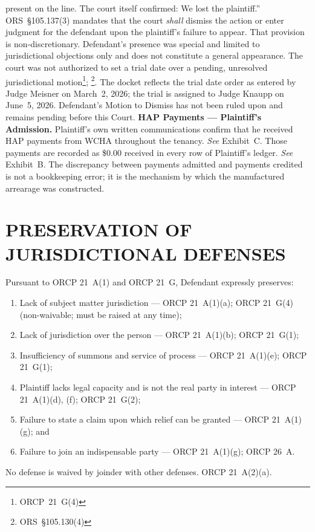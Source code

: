 \documentclass[10pt,letterpaper,oneside]{extarticle}
\begin{document}
present on the line. The court itself confirmed: We lost
the plaintiff.'' ORS~\S105.137(3) mandates that the court
\textit{shall} dismiss the action or enter judgment for the
defendant upon the plaintiff's failure to appear. That
provision is non-discretionary. Defendant's presence was
special and limited to jurisdictional objections only and
does not constitute a general appearance. The court was not
authorized to set a trial date over a pending, unresolved
jurisdictional motion\footnote{ORCP~21~G(4)}; \footnote{ORS~\S105.130(4)}.
The docket reflects the trial date order as entered by
Judge Meisner on March~2, 2026; the trial is assigned to
Judge Knaupp on June~5, 2026. Defendant's Motion to Dismiss
has not been ruled upon and remains pending before this
Court.
\textbf{HAP Payments --- Plaintiff's Admission.}
Plaintiff's own written communications confirm that he
received HAP payments from WCHA throughout the tenancy.
\textit{See} Exhibit~C. Those payments are recorded as
\$0.00 received in every row of Plaintiff's ledger.
\textit{See} Exhibit~B. The discrepancy between payments
admitted and payments credited is not a bookkeeping error;
it is the mechanism by which the manufactured arrearage was
constructed.
\section{\textbf{PRESERVATION OF JURISDICTIONAL DEFENSES}}
Pursuant to ORCP 21~A(1) and ORCP 21~G, Defendant expressly
preserves:
\begin{enumerate}[label=(\textbf{\alph*)},leftmargin=.5in,nosep]
	\item Lack of subject matter jurisdiction ---
	ORCP 21~A(1)(a); ORCP 21~G(4) (non-waivable; must be
	raised at any time);
	\item Lack of jurisdiction over the person ---
	ORCP 21~A(1)(b); ORCP 21~G(1);
	\item Insufficiency of summons and service of process ---
	ORCP 21~A(1)(e); ORCP 21~G(1);
	\item Plaintiff lacks legal capacity and is not the real
	party in interest --- ORCP 21~A(1)(d), (f);
	ORCP 21~G(2);
	\item Failure to state a claim upon which relief can be
	granted --- ORCP 21~A(1)(g); and
	\item Failure to join an indispensable party ---
	ORCP 21~A(1)(g); ORCP 26~A.
\end{enumerate}
\indent No defense is waived by joinder with other defenses.
ORCP 21~A(2)(a).
\end{document}
